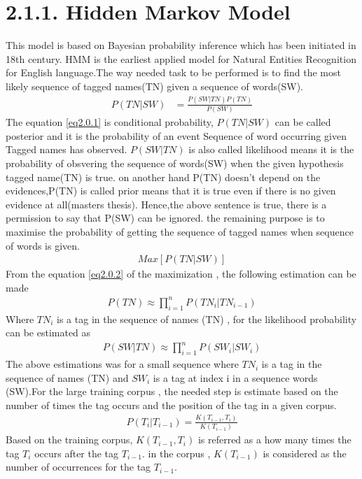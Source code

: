\section*{2.1.1. Hidden Markov Model}
This model is based on Bayesian probability inference which has been initiated in 18th century. HMM is the earliest applied model for Natural Entities Recognition for English language.The way needed task to be performed is to find the most likely sequence of tagged names(TN) given a sequence of words(SW).
\begin{align}
P(TN|SW) & = \frac{P(SW|TN)P(TN)}{P(SW)}\label{eq2.0.1}
\end{align}
The equation  \eqref{eq2.0.1} is conditional probability, $P(TN|SW)$ can be  called posterior and it is  the probability of an event Sequence of word occurring given Tagged names has observed. 
$P(SW|TN)$ is also called likelihood means it is the probability of obsvering the sequence of words(SW) when the given hypothesis tagged name(TN) is true. on another hand P(TN) doesn't depend on the evidences,P(TN) is called prior means that it is true even if there is no given evidence at all(masters thesis).
Hence,the above sentence is true, there is a permission to say  that P(SW) can be ignored.
the remaining purpose
is to maximise the probability of getting the sequence of tagged names when sequence of words is given.
\begin{align}
Max\left[P(TN|SW)\right] \label{eq2.0.2}
\end{align}
From the equation  \eqref{eq2.0.2} of the maximization , the following estimation can be made
\begin{align}
P(TN){\approx} \prod_{i=1}^{n} P({TN}_{i}|{TN}_{i-1}) \label{2.0.3}
\end{align}
Where ${TN}_{i}$ is a tag in the sequence of names (TN) , for the likelihood probability can be estimated as 
\begin{align}
P(SW|TN){\approx} \prod_{i=1}^{n} P({SW}_{i}|{SW}_{i})\label{2.0.4}
\end{align}
The above estimations was for a small sequence where ${TN}_{i}$ is a tag in the sequence of names (TN) and ${SW}_{i}$ is a tag at index i in a sequence words (SW).For the large training corpus , the needed step is estimate based on the number of times the tag occurs and the position of the tag in a given corpus.
\begin{align}
P(T_{i}|T_{i-1}) = \frac{K(T_{i-1},T_{i})}{K(T_{i-1})}\label{2.0.5}
\end{align}
Based on the training corpus, $K(T_{i-1},T_{i})$ is referred as a how many times the tag $T_{i}$ occurs after the tag $T_{i-1}$. in the corpus , $K(T_{i-1})$ is considered as the number of occurrences for the tag $T_{i-1}$.

